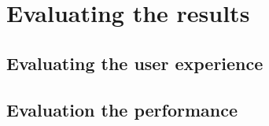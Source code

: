 \chapter{Evaluating the results}
\label{chap:evaluation}
\section{Evaluating the user experience}
\section{Evaluation the performance}